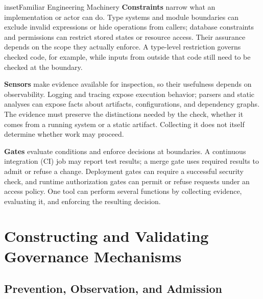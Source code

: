 
\begin{bookbox}{inset}{Familiar Engineering Machinery}
\label{inset-familiar-engineering-machinery}
\textbf{Constraints} narrow what an implementation or actor can do. Type systems and module boundaries can exclude invalid expressions or hide operations from callers; database constraints and permissions can restrict stored states or resource access. Their assurance depends on the scope they actually enforce. A type-level restriction governs checked code, for example, while inputs from outside that code still need to be checked at the boundary.

\textbf{Sensors} make evidence available for inspection, so their usefulness depends on observability. Logging and tracing expose execution behavior; parsers and static analyses can expose facts about artifacts, configurations, and dependency graphs. The evidence must preserve the distinctions needed by the check, whether it comes from a running system or a static artifact. Collecting it does not itself determine whether work may proceed.

\textbf{Gates} evaluate conditions and enforce decisions at boundaries. A continuous integration (CI) job may report test results; a merge gate uses required results to admit or refuse a change. Deployment gates can require a successful security check, and runtime authorization gates can permit or refuse requests under an access policy. One tool can perform several functions by collecting evidence, evaluating it, and enforcing the resulting decision.
\end{bookbox}

\section{Constructing and Validating Governance Mechanisms}\label{heading:constructing-and-evaluating-governance-mechanisms}

\subsection{Prevention, Observation, and Admission}\label{heading:prevention-and-observation}



